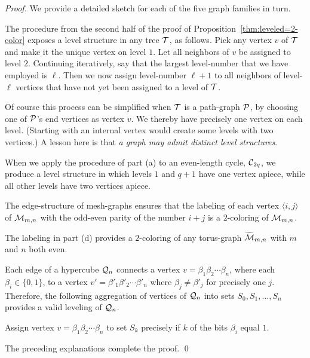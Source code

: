\begin{proof}
We provide a detailed sketch for each of the five graph families in turn.

\smallskip

The procedure from the second half of the proof of Proposition~\ref{thm:leveled=2-color} exposes a level structure in any tree $\mbox{$\cal T$}$, as follows.  Pick any vertex $v$ of $\mbox{$\cal T$}$ and make it the
unique vertex on level $1$.  Let all neighbors of $v$ be assigned to level $2$.  Continuing iteratively, say that the largest level-number that we have employed is $\ell$.  Then we now assign level-number $\ell +1$ to all neighbors of level-$\ell$ vertices that have not yet been
assigned to a level of $\mbox{$\cal T$}$.

\smallskip

Of course this process can be simplified when $\mbox{$\cal T$}$ is a path-graph $\mbox{$\cal P$}$, by choosing one of $\mbox{$\cal P$}$'s end vertices as vertex $v$.  We thereby have precisely one vertex on each level.  (Starting with an internal vertex would create some levels with two vertices.)  A lesson here is that {\em a graph may admit distinct level structures}.

\medskip

When we apply the procedure of part (a) to an even-length cycle, $\mbox{$\cal C$}_{2q}$, we produce a level structure in which levels $1$ and $q+1$ have one vertex apiece, while all other levels have two vertices apiece.

\medskip

The edge-structure of mesh-graphs ensures that the labeling of each vertex $\langle i,j \rangle$ of $\mbox{$\cal M$}_{m,n}$ with the odd-even parity of the number $i+j$ is a $2$-coloring of $\mbox{$\cal M$}_{m,n}$.

\medskip

The labeling in part (d) provides a $2$-coloring of any torus-graph $\widetilde{\mbox{$\cal M$}}_{m,n}$ with $m$ and $n$ both even.

\medskip

Each edge of a hypercube $\mbox{$\cal Q$}_n$ connects a vertex $v = \beta_1 \beta_2 \cdots \beta_n$, where each $\beta_i \in \{0,1\}$, to a vertex $v' = \beta'_1 \beta'_2 \cdots \beta'_n$ where  $\beta_j \neq \beta'_j$ for precisely one $j$.  Therefore, the following aggregation of vertices of $\mbox{$\cal Q$}_n$ into sets $S_0, S_1, \ldots, S_n$ provides a valid leveling of $\mbox{$\cal Q$}_n$.

\smallskip

Assign vertex $v = \beta_1 \beta_2 \cdots \beta_n$ to set $S_k$ precisely if $k$ of the bits $\beta_i$ equal $1$.

\medskip

\noindent
The preceding explanations complete the proof. \qed
\end{proof}

